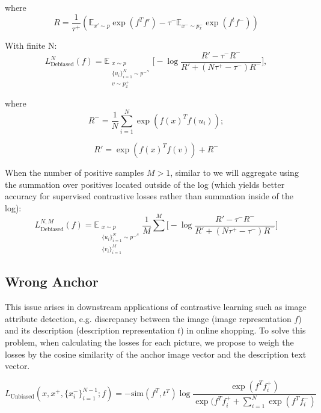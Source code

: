 \documentclass{article}
\begin{document}
where
\begin{equation}
R = \frac{1}{\tau^+} (\mathbb{E}_{x' \sim p} \exp(f^Tf') - \tau^- \mathbb{E}_{x^- \sim p_x^-} \exp(f^tf^-))
\end{equation}

With finite N:
\begin{equation} \label{eq:11}
L_{\text{Debiased}}^N (f) = \mathbb{E}_{\substack{x \sim p \\ \{u_i\}_{i=1}^N \sim p^-^N \\ v \sim p_x^+}} \bigg[-\log \frac{R' - \tau^- R^-}{R' + (N \tau^+ - \tau^-) R^-}\bigg],
\end{equation}

where
\begin{equation}
R^-= \frac{1}{N} \sum\limits_{i=1}^N \exp(f(x)^Tf(u_i));
\end{equation}

\begin{equation}
R' = \exp(f(x)^T f(v)) + R^-
\end{equation}

When the number of positive samples $M > 1$, similar to \citep{khosla2021supervised} we will aggregate using the summation over positives located outside of the log (which yields better accuracy for supervised contrastive losses rather than summation inside of the log):
\begin{equation} \label{eq:14}
L_{\text{Debiased}}^{N, M} (f) = \mathbb{E}_{\substack{x \sim p \\ \{u_i\}_{i=1}^N \sim p^-^N \\ \{v_i\}_{i=1}^M}} \frac{1}{M} \sum\limits^M \bigg[-\log \frac{R' - \tau^- R^-}{R' + (N \tau^+ - \tau^-) R^-}\bigg]
\end{equation}

\subsection{Wrong Anchor}
This issue arises in downstream applications of contrastive learning such as image attribute detection, e.g. discrepancy between the image (image representation $f$) and its description (description representation $t$) in online shopping. To solve this problem, when calculating the losses for each picture, we propose to weigh the losses by the cosine similarity of the anchor image vector and the description text vector.

\begin{equation} \label{eq:15}
L_{\text{Unbiased}}(x, x^+, \{x_i^-\}_{i=1}^{N-1}; f) = - \text{sim} (f^T, t^T) \log \frac{\exp(f^T f_i^+)}{\exp(f^T f_i^+ + \sum_{i=1}^N \exp(f^T f_i^-)}
\end{equation}
\end{document}
